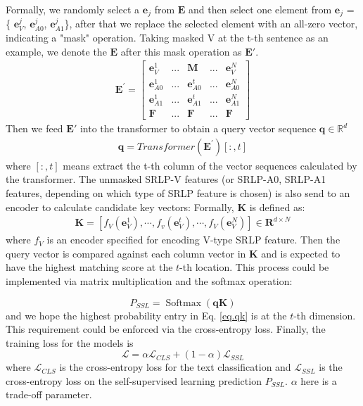 \documentclass{article}
\begin{document}
Formally, we randomly select a $\mathbf{e}_j$ from $\mathbf{E}$ and then select one element from $\mathbf{e}_j$ = \{  $\mathbf{e}_{V}^j$,  $\mathbf{e}_{A0}^j$,  $\mathbf{e}_{A1}^j$\}, after that we replace the selected element with an all-zero vector, indicating a "mask" operation. Taking masked V at the t-th sentence as an example, we denote the $\mathbf{E}$ after this mask operation as $\mathbf{E}'$.
\[
\begin{aligned}
\mathbf{E}^{\prime} = \begin{bmatrix}
                \mathbf{e}_V^1  & ...& \mathbf{M}& ...& \mathbf{e}_V^N\\
                \mathbf{e}_{A0}^1  & ...& \mathbf{e}_{A0}^t & ...& \mathbf{e}_{A0}^N \\
                \mathbf{e}_{A1}^1  & ...& \mathbf{e}_{A1}^t& ...& \mathbf{e}_{A1}^N \\
                \mathbf{F}  & ...& \mathbf{F} & ...& \mathbf{F} 
            \end{bmatrix}
\end{aligned}
\label{eq.srl}
\]
Then we feed $\mathbf{E}'$ into the transformer to obtain a query vector sequence $\mathbf{q} \in \mathbb{R}^d$
\begin{align}
    \textbf{q} = Transformer(\textbf{E}^{\prime})[:,t] \nonumber
    \label{eq.qk}
\end{align}
where $[:,t]$ means extract the t-th column of the vector sequences calculated by the transformer. The unmasked SRLP-V features (or SRLP-A0, SRLP-A1 features, depending on which type of SRLP feature is chosen) is also send to an encoder to calculate candidate key vectors:
Formally, $\mathbf{K}$ is defined as:
\begin{align}
\mathbf{K} =  [f_V(\mathbf{e}_V^1), \cdots, f_v(\mathbf{e}_V^t), \cdots, f_V(\mathbf{e}_V^N)] \in \mathbf{R}^{d\times N}\nonumber
\end{align} where $f_V$ is an encoder specified for encoding V-type SRLP feature. Then the query vector is compared against each column vector in $\mathbf{K}$ and is expected to have the highest matching score at the $t$-th location. This process could be implemented via matrix multiplication and the softmax operation:

\begin{equation}
    P_{SSL} = \operatorname{Softmax}(\mathbf{q}\mathbf{K})
    \label{eq.qk}
\end{equation}
and we hope the highest probability entry in Eq. 
\ref{eq.qk} is at the $t$-th dimension. This requirement could be enforced via the cross-entropy loss. Finally, the training loss for the models is 
\begin{equation}
    \mathcal{L} = \alpha \mathcal{L}_{CLS}+ (1-\alpha)  \mathcal{L}_{SSL}
    \label{eq.loss}
\end{equation}
where $\mathcal{L}_{CLS}$ is the cross-entropy loss for the text classification and $\mathcal{L}_{SSL}$ is the cross-entropy loss on the self-supervised learning prediction $P_{SSL}$. $\alpha$ here is a trade-off parameter.
\end{document}

